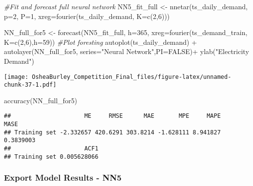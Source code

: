 \documentclass[
]{article}
\newenvironment{Shaded}{\begin{snugshade}}{\end{snugshade}}
\newcommand{\AttributeTok}[1]{\textcolor[rgb]{0.77,0.63,0.00}{#1}}
\newcommand{\CommentTok}[1]{\textcolor[rgb]{0.56,0.35,0.01}{\textit{#1}}}
\newcommand{\ConstantTok}[1]{\textcolor[rgb]{0.00,0.00,0.00}{#1}}
\newcommand{\DecValTok}[1]{\textcolor[rgb]{0.00,0.00,0.81}{#1}}
\newcommand{\FunctionTok}[1]{\textcolor[rgb]{0.00,0.00,0.00}{#1}}
\newcommand{\NormalTok}[1]{#1}
\newcommand{\OtherTok}[1]{\textcolor[rgb]{0.56,0.35,0.01}{#1}}
\newcommand{\SpecialCharTok}[1]{\textcolor[rgb]{0.00,0.00,0.00}{#1}}
\newcommand{\StringTok}[1]{\textcolor[rgb]{0.31,0.60,0.02}{#1}}
\begin{document}
\begin{Shaded}
\begin{Highlighting}[]
\CommentTok{\#Fit and forecast full neural network}
\NormalTok{NN5\_fit\_full }\OtherTok{\textless{}{-}}  \FunctionTok{nnetar}\NormalTok{(ts\_daily\_demand,}
                 \AttributeTok{p=}\DecValTok{2}\NormalTok{,}
                 \AttributeTok{P=}\DecValTok{1}\NormalTok{,}
                 \AttributeTok{xreg=}\FunctionTok{fourier}\NormalTok{(ts\_daily\_demand, }\AttributeTok{K=}\FunctionTok{c}\NormalTok{(}\DecValTok{2}\NormalTok{,}\DecValTok{6}\NormalTok{)))}

\NormalTok{NN\_full\_for5 }\OtherTok{\textless{}{-}} \FunctionTok{forecast}\NormalTok{(NN5\_fit\_full, }
                   \AttributeTok{h=}\DecValTok{365}\NormalTok{,}
                   \AttributeTok{xreg=}\FunctionTok{fourier}\NormalTok{(ts\_demand\_train, }
                                          \AttributeTok{K=}\FunctionTok{c}\NormalTok{(}\DecValTok{2}\NormalTok{,}\DecValTok{6}\NormalTok{),}\AttributeTok{h=}\DecValTok{59}\NormalTok{))}
\CommentTok{\#Plot foresting }
\FunctionTok{autoplot}\NormalTok{(ts\_daily\_demand) }\SpecialCharTok{+}
  \FunctionTok{autolayer}\NormalTok{(NN\_full\_for5, }\AttributeTok{series=}\StringTok{"Neural Network"}\NormalTok{,}\AttributeTok{PI=}\ConstantTok{FALSE}\NormalTok{)}\SpecialCharTok{+}
  \FunctionTok{ylab}\NormalTok{(}\StringTok{"Electricity Demand"}\NormalTok{) }
\end{Highlighting}
\end{Shaded}

\texttt{[image: OsheaBurley\_Competition\_Final\_files/figure-latex/unnamed-chunk-37-1.pdf]}

\begin{Shaded}
\begin{Highlighting}[]
\FunctionTok{accuracy}\NormalTok{(NN\_full\_for5)}
\end{Highlighting}
\end{Shaded}

\begin{verbatim}
##                     ME     RMSE      MAE       MPE     MAPE      MASE
## Training set -2.332657 420.6291 303.8214 -1.628111 8.941827 0.3839003
##                     ACF1
## Training set 0.005628066
\end{verbatim}

\hypertarget{export-model-results---nn5}{%
\subsubsection{Export Model Results -
NN5}\label{export-model-results---nn5}}
\end{document}
